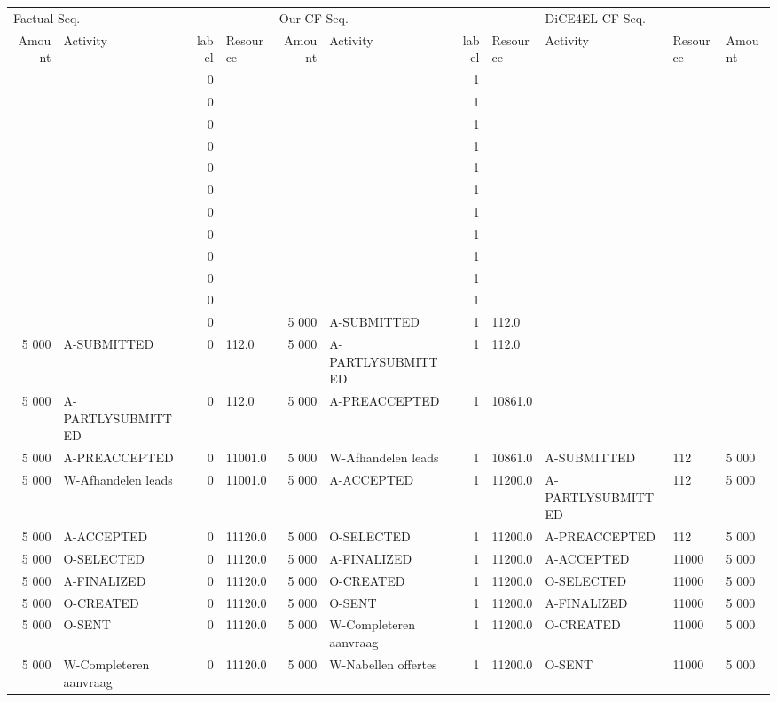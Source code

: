 \begin{tabular}{rlrlrlrllll}
\toprule
\multicolumn{4}{l}{Factual Seq.} & \multicolumn{4}{l}{Our CF Seq.} & \multicolumn{3}{l}{DiCE4EL CF Seq.} \\
Amount & Activity & label & Resource & Amount & Activity & label & Resource & Activity & Resource & Amount \\
\midrule
 &  & 0 &  &  &  & 1 &  &  &  &  \\
 &  & 0 &  &  &  & 1 &  &  &  &  \\
 &  & 0 &  &  &  & 1 &  &  &  &  \\
 &  & 0 &  &  &  & 1 &  &  &  &  \\
 &  & 0 &  &  &  & 1 &  &  &  &  \\
 &  & 0 &  &  &  & 1 &  &  &  &  \\
 &  & 0 &  &  &  & 1 &  &  &  &  \\
 &  & 0 &  &  &  & 1 &  &  &  &  \\
 &  & 0 &  &  &  & 1 &  &  &  &  \\
 &  & 0 &  &  &  & 1 &  &  &  &  \\
 &  & 0 &  &  &  & 1 &  &  &  &  \\
 &  & 0 &  & 5 000 & A-SUBMITTED & 1 & 112.0 &  &  &  \\
5 000 & A-SUBMITTED & 0 & 112.0 & 5 000 & A-PARTLYSUBMITTED & 1 & 112.0 &  &  &  \\
5 000 & A-PARTLYSUBMITTED & 0 & 112.0 & 5 000 & A-PREACCEPTED & 1 & 10861.0 &  &  &  \\
5 000 & A-PREACCEPTED & 0 & 11001.0 & 5 000 & W-Afhandelen leads & 1 & 10861.0 & A-SUBMITTED & 112 & 5 000 \\
5 000 & W-Afhandelen leads & 0 & 11001.0 & 5 000 & A-ACCEPTED & 1 & 11200.0 & A-PARTLYSUBMITTED & 112 & 5 000 \\
5 000 & A-ACCEPTED & 0 & 11120.0 & 5 000 & O-SELECTED & 1 & 11200.0 & A-PREACCEPTED & 112 & 5 000 \\
5 000 & O-SELECTED & 0 & 11120.0 & 5 000 & A-FINALIZED & 1 & 11200.0 & A-ACCEPTED & 11000 & 5 000 \\
5 000 & A-FINALIZED & 0 & 11120.0 & 5 000 & O-CREATED & 1 & 11200.0 & O-SELECTED & 11000 & 5 000 \\
5 000 & O-CREATED & 0 & 11120.0 & 5 000 & O-SENT & 1 & 11200.0 & A-FINALIZED & 11000 & 5 000 \\
5 000 & O-SENT & 0 & 11120.0 & 5 000 & W-Completeren aanvraag & 1 & 11200.0 & O-CREATED & 11000 & 5 000 \\
5 000 & W-Completeren aanvraag & 0 & 11120.0 & 5 000 & W-Nabellen offertes & 1 & 11200.0 & O-SENT & 11000 & 5 000 \\

\end{tabular}
